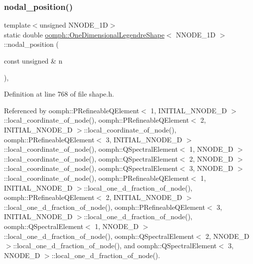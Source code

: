 \subsubsection{\texorpdfstring{nodal\+\_\+position()}{nodal\_position()}}
{\footnotesize\ttfamily template$<$unsigned N\+N\+O\+D\+E\+\_\+1D$>$ \\
static double \hyperlink{classoomph_1_1OneDimensionalLegendreShape}{oomph\+::\+One\+Dimensional\+Legendre\+Shape}$<$ N\+N\+O\+D\+E\+\_\+1D $>$\+::nodal\+\_\+position (\begin{DoxyParamCaption}\item[{const unsigned \&}]{n }\end{DoxyParamCaption})\hspace{0.3cm}{\ttfamily [inline]}, {\ttfamily [static]}}



Definition at line 768 of file shape.\+h.



Referenced by oomph\+::\+P\+Refineable\+Q\+Element$<$ 1, I\+N\+I\+T\+I\+A\+L\+\_\+\+N\+N\+O\+D\+E\+\_\+D $>$\+::local\+\_\+coordinate\+\_\+of\+\_\+node(), oomph\+::\+P\+Refineable\+Q\+Element$<$ 2, I\+N\+I\+T\+I\+A\+L\+\_\+\+N\+N\+O\+D\+E\+\_\+D $>$\+::local\+\_\+coordinate\+\_\+of\+\_\+node(), oomph\+::\+P\+Refineable\+Q\+Element$<$ 3, I\+N\+I\+T\+I\+A\+L\+\_\+\+N\+N\+O\+D\+E\+\_\+D $>$\+::local\+\_\+coordinate\+\_\+of\+\_\+node(), oomph\+::\+Q\+Spectral\+Element$<$ 1, N\+N\+O\+D\+E\+\_\+D $>$\+::local\+\_\+coordinate\+\_\+of\+\_\+node(), oomph\+::\+Q\+Spectral\+Element$<$ 2, N\+N\+O\+D\+E\+\_\+D $>$\+::local\+\_\+coordinate\+\_\+of\+\_\+node(), oomph\+::\+Q\+Spectral\+Element$<$ 3, N\+N\+O\+D\+E\+\_\+D $>$\+::local\+\_\+coordinate\+\_\+of\+\_\+node(), oomph\+::\+P\+Refineable\+Q\+Element$<$ 1, I\+N\+I\+T\+I\+A\+L\+\_\+\+N\+N\+O\+D\+E\+\_\+D $>$\+::local\+\_\+one\+\_\+d\+\_\+fraction\+\_\+of\+\_\+node(), oomph\+::\+P\+Refineable\+Q\+Element$<$ 2, I\+N\+I\+T\+I\+A\+L\+\_\+\+N\+N\+O\+D\+E\+\_\+D $>$\+::local\+\_\+one\+\_\+d\+\_\+fraction\+\_\+of\+\_\+node(), oomph\+::\+P\+Refineable\+Q\+Element$<$ 3, I\+N\+I\+T\+I\+A\+L\+\_\+\+N\+N\+O\+D\+E\+\_\+D $>$\+::local\+\_\+one\+\_\+d\+\_\+fraction\+\_\+of\+\_\+node(), oomph\+::\+Q\+Spectral\+Element$<$ 1, N\+N\+O\+D\+E\+\_\+D $>$\+::local\+\_\+one\+\_\+d\+\_\+fraction\+\_\+of\+\_\+node(), oomph\+::\+Q\+Spectral\+Element$<$ 2, N\+N\+O\+D\+E\+\_\+D $>$\+::local\+\_\+one\+\_\+d\+\_\+fraction\+\_\+of\+\_\+node(), and oomph\+::\+Q\+Spectral\+Element$<$ 3, N\+N\+O\+D\+E\+\_\+D $>$\+::local\+\_\+one\+\_\+d\+\_\+fraction\+\_\+of\+\_\+node().



